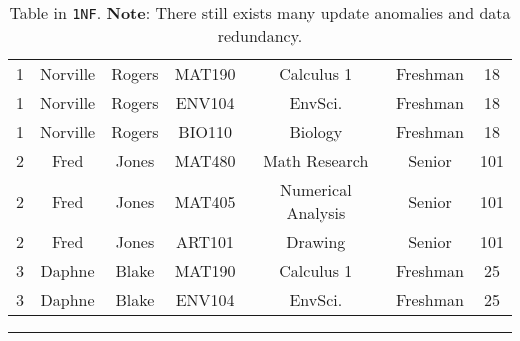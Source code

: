 \documentclass{article}
\begin{document}
\newpage




\begin{table}[h!]
\caption{Table in \texttt{1NF}.  \textbf{Note}: There still exists many update anomalies and data redundancy.}
\begin{center}

\begin{tabular}{|c|c|c|c|c|c|c|}
   \hline
  \cellcolor{excel}{StudentID}  & \cellcolor{excel}{First} & \cellcolor{excel}{Last} &   \cellcolor{excel}{Class} &  \cellcolor{excel}{Description}
&  \cellcolor{excel}{Rank} &  \cellcolor{excel}{Hours} \\
  \hline
  1 & Norville & Rogers & MAT190 & Calculus 1 &   Freshman & 18 \\
      \hline
  1 & Norville & Rogers & ENV104 & EnvSci. &   Freshman & 18 \\
      \hline
  1 & Norville & Rogers & BIO110 & Biology &   Freshman & 18 \\
      \hline
  2 & Fred & Jones & MAT480  & Math Research &  Senior & 101 \\ %
  \hline
  2 & Fred &  Jones & MAT405 &Numerical Analysis &   Senior & 101\\
      \hline 
  2 & Fred &  Jones & ART101 & Drawing  &   Senior & 101 \\
   \hline
   3 & Daphne & Blake & MAT190 & Calculus 1 &   Freshman & 25 \\
   \hline
   3 & Daphne & Blake &ENV104 & EnvSci. &   Freshman & 25\\
 
      \hline 
\end{tabular}
\end{center}
\label{tab:1nf}
\end{table}%
% 
% 
% 

\hspace{-0.5cm}\rule[-0.101in]{\textwidth}{0.0025in}
  
 
 
 
 
 
 
 
 
 
 
 
 
 
 
 
 
\end{document}
